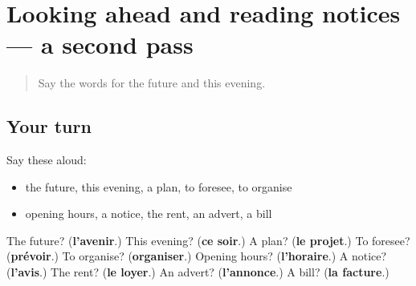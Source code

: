 \section[(dialogue)]{Looking ahead and reading notices — a second pass}

\label{lesson:FR-R142-second-pass-looking-ahead-and-reading-notices}



\begin{quote}
Say the words for the future and this evening.
\end{quote}

\subsection*{Your turn}
Say these aloud:

\begin{itemize}
\raggedright
  \item the future, this evening, a plan, to foresee, to organise
  \item opening hours, a notice, the rent, an advert, a bill
\end{itemize}

\begin{tcolorbox}[breakable,colback=teal!4,colframe=teal!35!black,title={Before you move on}]
The future? (\textbf{l'avenir}.) This evening? (\textbf{ce soir}.) A plan? (\textbf{le projet}.) To foresee? (\textbf{prévoir}.) To organise? (\textbf{organiser}.) Opening hours? (\textbf{l'horaire}.) A notice? (\textbf{l'avis}.) The rent? (\textbf{le loyer}.) An advert? (\textbf{l'annonce}.) A bill? (\textbf{la facture}.)
\end{tcolorbox}
